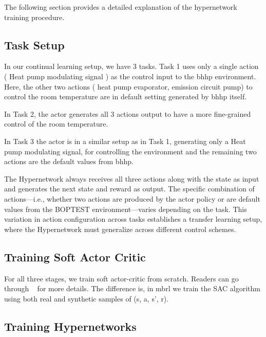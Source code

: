 \documentclass{article}
\begin{document}
The following section provides a detailed explanation of the hypernetwork training procedure.

\subsection{Task Setup}
In our continual learning setup, we have 3 tasks.
Task 1 uses only a single action ( Heat pump modulating signal ) as the control input to the \gls{bhhp} environment. Here, the other two actions ( heat pump evaporator, emission circuit pump) to control the room temperature are in default setting generated by \gls{bhhp} itself.

In Task 2, the actor generates all 3 actions output to have a more fine-grained control of the room temperature.

In Task 3 the actor is in a similar setup as in Task 1, generating only a Heat pump modulating signal, for controlling the environment and the remaining two actions are the default values from 
\gls{bhhp}.

The Hypernetwork always receives all three actions along with the state as input and generates the next state and reward as output. The specific combination of actions—i.e., whether two actions are produced by the actor policy or are default values from the BOPTEST environment—varies depending on the task. This variation in action configuration across tasks establishes a transfer learning setup, where the Hypernetwork must generalize across different control schemes.



\subsection{Training Soft Actor Critic}
For all three stages, we train soft actor-critic from scratch. 
Readers can go through ~\cite{Haarnoja} for more details. The difference is, in \gls{mbrl} we train the SAC algorithm using both real and synthetic samples of (s, a, s', r).

\subsection{ Training Hypernetworks}
\end{document}
